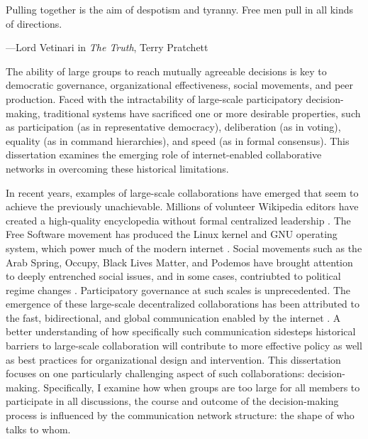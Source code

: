 \epigraph
{Pulling together is the aim of despotism and tyranny. Free men pull in all kinds of directions.}
{---Lord Vetinari in {\em The Truth}, Terry Pratchett}

The ability of large groups to reach mutually agreeable decisions is key to
democratic governance, organizational effectiveness, social movements, and peer production.
Faced with the intractability of large-scale participatory decision-making, traditional
systems have sacrificed one or more desirable properties, such as participation
(as in representative democracy), deliberation (as in voting), equality
(as in command hierarchies), and speed (as in formal consensus).
This dissertation examines the emerging role of internet-enabled collaborative
networks in overcoming these historical limitations.

In recent years, examples of large-scale collaborations have emerged that seem
to achieve the previously unachievable. Millions of volunteer Wikipedia editors
have created a high-quality encyclopedia without formal centralized leadership
\cite{keegan_evolution_2017, giles_internet_2005}.
The Free Software movement has produced the Linux kernel and GNU operating
system, which power much of the modern internet
\cite{coleman_coding_2012, benkler_coases_2002, raymond_cathedral_1999}.
Social movements such as the Arab Spring, Occupy, Black Lives Matter, and
Podemos have brought attention to deeply entrenched social issues,
and in some cases, contriubted to political regime changes
\cite{tufekci_twitter_2017, gonzalez-bailon_networked_2016}.
Participatory governance at such scales is unprecedented.
The emergence of these large-scale decentralized collaborations has been
attributed to the fast, bidirectional,
and global communication enabled by the internet
\cite{tufekci_twitter_2017, benkler_coases_2002}.
A better understanding of how specifically such communication sidesteps
historical barriers to large-scale collaboration will contribute to more
effective policy as well as best practices for organizational design and
intervention.
This dissertation focuses on one particularly challenging aspect of
such collaborations: decision-making.
Specifically, I examine how
when groups are too large for all members to participate in all discussions,
the course and outcome of the decision-making process is influenced by the
communication network structure: the shape of who talks to whom.

